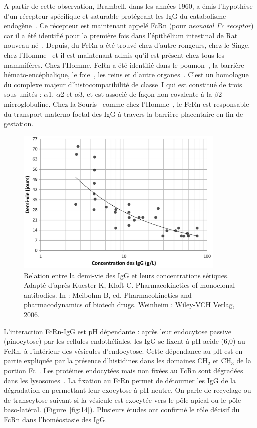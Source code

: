 A partir de cette observation, Brambell, dans les années 1960, a émis l'hypothèse d'un récepteur spécifique et saturable protégeant les IgG du catabolisme endogène~\citep{REF24}. Ce récepteur est maintenant appelé FcRn (pour \textit{neonatal Fc receptor}) car il a été identifié pour la première fois dans l'épithélium intestinal de Rat nouveau-né~\citep{REF25}. Depuis, du FcRn a été trouvé chez d'autre rongeurs, chez le Singe, chez l'Homme~\citep{REF26} et il est maintenant admis qu'il est présent chez tous les mammifères. Chez l'Homme, FcRn a été identifié dans le poumon~\citep{REF27}, la barrière hémato-encéphalique, le foie~\citep{REF28}, les reins et d'autre organes~\citep{REF29}. C'est un homologue du complexe majeur d'histocompatibilité de classe~I qui est constitué de trois sous-unités : $\alpha$1, $\alpha$2 et $\alpha$3, et est associé de façon non covalente à la $\beta 2$-microglobuline. Chez la Souris~\citep{REF30, REF31} comme chez l'Homme~\citep{REF32, REF33}, le FcRn est responsable du transport materno-foetal des IgG à travers la barrière placentaire en fin de gestation.

\begin{figure}[htbp]
	\centering
		\includegraphics[width=10cm]{figures/raster/FIG_13}
	\caption[Relation entre la demi-vie des IgG et leurs concentrations sériques.]{Relation entre la demi-vie des IgG et leurs concentrations sériques. Adapté d'après Kuester K, Kloft C. Pharmacokinetics of monoclonal antibodies. In : Meibohm B, ed. Pharmacokinetics and pharmacodynamics of biotech drugs. Weinheim : Wiley-VCH Verlag, 2006.}
	\label{fig:13}
\end{figure}

L'interaction FcRn-IgG est pH dépendante : après leur endocytose passive (pinocytose) par les cellules endothéliales, les IgG se fixent à pH acide (6,0) au FcRn, à l'intérieur des vésicules d'endocytose. Cette dépendance au pH est en partie expliquée par la présence d'histidines dans les domaines CH$_2$ et CH$_3$ de la portion Fc~\citep{REF34, REF35}. Les protéines endocytées mais non fixées au FcRn sont dégradées dans les lysosomes~\citep{REF36, REF37}. La fixation au FcRn permet de détourner les IgG de la dégradation en permettant leur exocytose à pH neutre. On parle de recyclage ou de transcytose suivant si la vésicule est exocytée vers le pôle apical ou le pôle baso-latéral. (Figure~\ref{fig:14}). Plusieurs études ont confirmé le rôle décisif du FcRn dans l'homéostasie des IgG.


